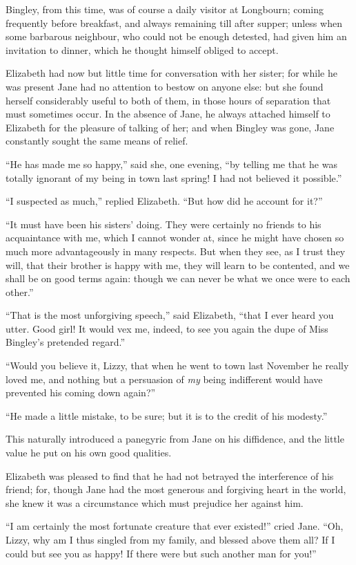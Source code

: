 \documentclass[12pt,openright]{book}
\begin{document}
Bingley, from this time, was of course a daily visitor at Longbourn; coming frequently before breakfast, and always remaining till after supper; unless when some barbarous neighbour, who could not be enough detested, had given him an invitation to dinner, which he thought himself obliged to accept.

Elizabeth had now but little time for conversation with her sister; for while he was present Jane had no attention to bestow on anyone else: but she found herself considerably useful to both of them, in those hours of separation that must sometimes occur. In the absence of Jane, he always attached himself to Elizabeth for the pleasure of talking of her; and when Bingley was gone, Jane constantly sought the same means of relief.

“He has made me so happy,” said she, one evening, “by telling me that he was totally ignorant of my being in town last spring! I had not believed it possible.”

“I suspected as much,” replied Elizabeth. “But how did he account for it?”

“It must have been his sisters’ doing. They were certainly no friends to his acquaintance with me, which I cannot wonder at, since he might have chosen so much more advantageously in many respects. But when they see, as I trust they will, that their brother is happy with me, they will learn to be contented, and we shall be on good terms again: though we can never be what we once were to each other.”

“That is the most unforgiving speech,” said Elizabeth, “that I ever heard you utter. Good girl! It would vex me, indeed, to see you again the dupe of Miss Bingley’s pretended regard.”

“Would you believe it, Lizzy, that when he went to town last November he really loved me, and nothing but a persuasion of \textit{my} being indifferent would have prevented his coming down again?”

“He made a little mistake, to be sure; but it is to the credit of his modesty.”

This naturally introduced a panegyric from Jane on his diffidence, and the little value he put on his own good qualities.

Elizabeth was pleased to find that he had not betrayed the interference of his friend; for, though Jane had the most generous and forgiving heart in the world, she knew it was a circumstance which must prejudice her against him.

“I am certainly the most fortunate creature that ever existed!” cried Jane. “Oh, Lizzy, why am I thus singled from my family, and blessed above them all? If I could but see you as happy! If there were but such another man for you!”
\end{document}
